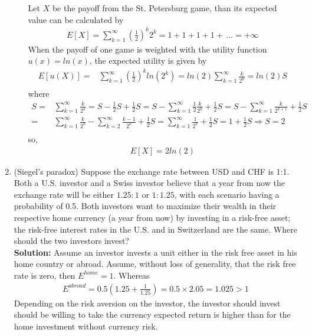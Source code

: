 \documentclass[letterpaper,12pt]{article}
\theoremstyle{definition}
\begin{document}
\begin{enumerate}
\begin{itemize}
Let $X$ be the payoff from the St. Petersburg game, than its expected value can be calculated by
\begin{align*}
E[X] = \sum_{k=1}^\infty \left(\frac{1}{2} \right)^k 2^{k} =1+ 1+ 1+ 1+ \,... = +\infty
\end{align*}
When the payoff of one game is weighted with the utility function $u(x)=ln(x)$, the expected utility is given by
\begin{align*}
E[u(X)] =& \sum_{k=1}^\infty \left(\frac{1}{2}\right)^k  ln(2^{k}) =  ln(2) \sum_{k=1}^\infty \frac{k}{2^k} = ln(2) S \\ 
\end{align*} where
\begin{align*}
S=& \sum_{k=1}^\infty \frac{k}{2^k} = S -\frac{1}{2}S+ \frac{1}{2}S = S-\sum_{k=1}^\infty \frac{1}{2}\frac{k}{2^k}+ \frac{1}{2}S = S-\sum_{k=1}^\infty \frac{k}{2^{k+1}}+ \frac{1}{2}S \\
=&  \sum_{k=1}^\infty \frac{k}{2^k}- \sum_{k=2}^\infty \frac{k-1}{2^{k}}+ \frac{1}{2}S = \sum^{\infty}_{k=1} \frac{1}{2^k} + \frac{1}{2}S = 1 + \frac{1}{2}S \Rightarrow S=2\\
\end{align*}
so,
\begin{align*}
E[X] = 2ln(2)
\end{align*}
		\end{itemize}
	\item (Siegel's paradox) Suppose the exchange rate between USD and CHF is 1:1. Both a U.S. investor and a Swiss investor believe that a year from now the exchange rate will be either $1.25:1$ or $1:1.25$, with each scenario having a probability of 0.5. Both investors want to maximize their wealth in their respective home currency (a year from now) by investing in a risk-free asset; the risk-free interest rates in the U.S. and in Switzerland are the same. Where should the two investors invest?\\

\textbf{Solution:}
Assume an investor invests a unit either in the risk free asset in his home country or abroad. Assume, without loss of generality, that the risk free rate is zero, then $E^{home} = 1$. Whereas \begin{align*}
E^{abroad}=0.5  (1.25 + \frac{1}{1.25} ) = 0.5 \times 2.05 = 1.025 > 1
\end{align*} Depending on the risk aversion on the investor, the investor should invest should be willing to take the currency expected return is higher than for the home investment without currency risk.


\end{enumerate}
\end{document}
